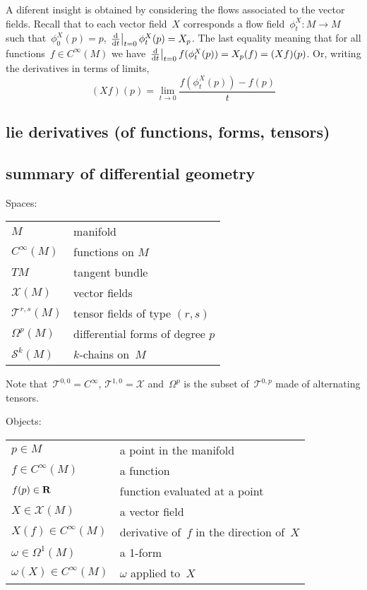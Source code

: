 A diferent insight is obtained by considering the flows associated to the
vector fields.  Recall that to each vector field~$X$ corresponds a flow
field~$\phi^X_t:M\to M$ such that~$\phi^X_0(p)=p$,
$\left.\frac{\mathrm{d}}{\mathrm{d} t}\right|_{t=0}\phi^X_t(p)=X_p$.  The last equality
meaning that for all functions~$f\in C^\infty(M)$ we have
$\left.\frac{\mathrm{d}}{\mathrm{d} t}\right|_{t=0}f(\phi^X_t(p))=X_p(f)=(Xf)(p)$.
	Or,  writing the derivatives in terms of limits,
\[
	(Xf)(p) = \lim_{t\to0}\frac{f(\phi^X_t(p))-f(p)}t
\]







\subsection{lie derivatives (of functions, forms, tensors)}

\clearpage
\subsection{summary of differential geometry}

Spaces:

\begin{tabular}{l|l}
	\hline
	$M$ & manifold \\
	$C^\infty(M)$ & functions on $M$ \\
	$TM$ & tangent bundle \\
	$\mathcal{X}(M)$ & vector fields \\
	$\mathcal{T}^{r,s}(M)$ & tensor fields of type $(r,s)$ \\
	$\Omega^p(M)$ & differential forms of degree $p$\\
	$\mathcal{S}^k(M)$ & $k$-chains on~$M$
\end{tabular}

Note that~$\mathcal{T}^{0,0}=C^\infty$,
$\mathcal{T}^{1,0}=\mathcal{X}$ and~$\Omega^p$ is the subset
of~$\mathcal{T}^{0,p}$ made of alternating tensors.


\bigskip

Objects:

\begin{tabular}{l|l}
	\hline
	$p\in M$ & a point in the manifold \\
	$f\in C^\infty(M)$ &a function \\
	$f(p)\in\mathbf{R}$ & function evaluated at a point \\
	$X\in \mathcal{X}(M)$ & a vector field \\
	$X(f)\in C^\infty(M)$ & derivative of~$f$ in the direction of~$X$ \\
	$\omega\in \Omega^1(M)$ & a 1-form \\
	$\omega(X)\in C^\infty(M)$ & $\omega$ applied to~$X$ \\
\end{tabular}


